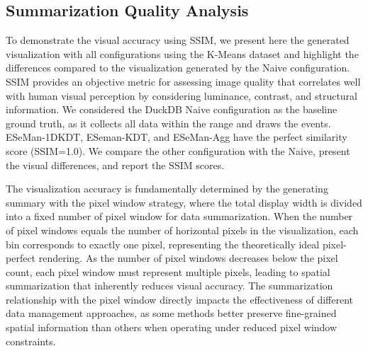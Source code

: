 \begin{refsection}


\section{Summarization Quality Analysis}

To demonstrate the visual accuracy using SSIM, we present here the generated visualization with all configurations using the K-Means dataset and highlight the differences compared to the visualization generated by the Naive configuration. SSIM provides an objective metric for assessing image quality that correlates well with human visual perception by considering luminance, contrast, and structural information. We considered the DuckDB Naive configuration as the baseline ground truth, as it collects all data within the range and draws the events. ESeMan-1DKDT, ESeman-KDT, and ESeMan-Agg have the perfect similarity score (SSIM=1.0). We compare the other configuration with the Naive, present the visual differences, and report the SSIM scores.

The visualization accuracy is fundamentally determined by the generating summary with the pixel window strategy, where the total display width is divided into a fixed number of pixel window for data summarization. When the number of pixel windows equals the number of horizontal pixels in the visualization, each bin corresponds to exactly one pixel, representing the theoretically ideal pixel-perfect rendering. As the number of pixel windows decreases below the pixel count, each pixel window must represent multiple pixels, leading to spatial summarization that inherently reduces visual accuracy. The summarization relationship with the pixel window directly impacts the effectiveness of different data management approaches, as some methods better preserve fine-grained spatial information than others when operating under reduced pixel window constraints.


\end{refsection}

